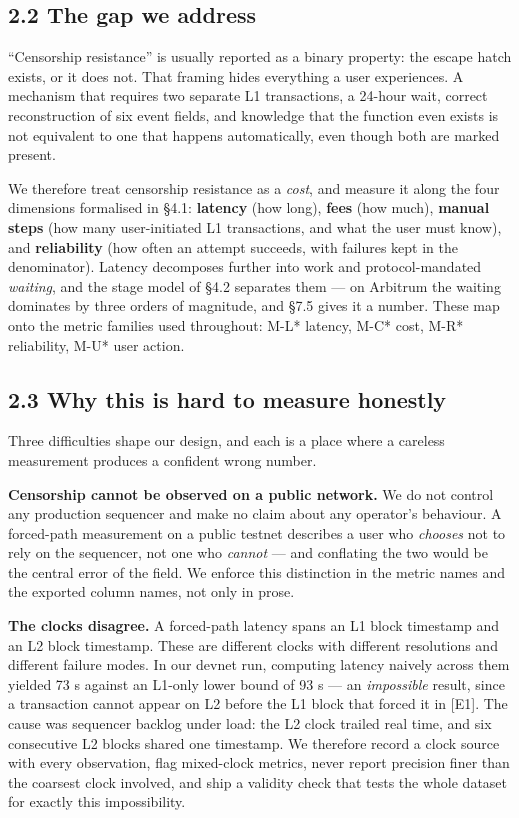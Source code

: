 \documentclass[conference]{IEEEtran}
\renewcommand{\_}{\textunderscore\allowbreak}
\begin{document}
\subsection{2.2 The gap we address}\label{the-gap-we-address}

``Censorship resistance'' is usually reported as a binary property: the
escape hatch exists, or it does not. That framing hides everything a
user experiences. A mechanism that requires two separate L1
transactions, a 24-hour wait, correct reconstruction of six event
fields, and knowledge that the function even exists is not equivalent to
one that happens automatically, even though both are marked present.

We therefore treat censorship resistance as a \emph{cost}, and measure
it along the four dimensions formalised in §4.1: \textbf{latency} (how
long), \textbf{fees} (how much), \textbf{manual steps} (how many
user-initiated L1 transactions, and what the user must know), and
\textbf{reliability} (how often an attempt succeeds, with failures kept
in the denominator). Latency decomposes further into work and
protocol-mandated \emph{waiting}, and the stage model of §4.2 separates
them --- on Arbitrum the waiting dominates by three orders of magnitude,
and §7.5 gives it a number. These map onto the metric families used
throughout: M-L* latency, M-C* cost, M-R* reliability, M-U* user action.

\subsection{2.3 Why this is hard to measure
honestly}\label{why-this-is-hard-to-measure-honestly}

Three difficulties shape our design, and each is a place where a
careless measurement produces a confident wrong number.

\textbf{Censorship cannot be observed on a public network.} We do not
control any production sequencer and make no claim about any operator's
behaviour. A forced-path measurement on a public testnet describes a
user who \emph{chooses} not to rely on the sequencer, not one who
\emph{cannot} --- and conflating the two would be the central error of
the field. We enforce this distinction in the metric names and the
exported column names, not only in prose.

\textbf{The clocks disagree.} A forced-path latency spans an L1 block
timestamp and an L2 block timestamp. These are different clocks with
different resolutions and different failure modes. In our devnet run,
computing latency naively across them yielded 73 s against an L1-only
lower bound of 93 s --- an \emph{impossible} result, since a transaction
cannot appear on L2 before the L1 block that forced it in {[}E1{]}. The
cause was sequencer backlog under load: the L2 clock trailed real time,
and six consecutive L2 blocks shared one timestamp. We therefore record
a clock source with every observation, flag mixed-clock metrics, never
report precision finer than the coarsest clock involved, and ship a
validity check that tests the whole dataset for exactly this
impossibility.
\end{document}

